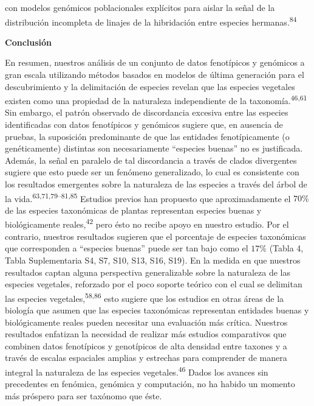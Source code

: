 \documentclass[
  11pt,
]{article}
\begin{document}
con modelos genómicos poblacionales explícitos para aislar la señal de la distribución incompleta de linajes de la hibridación entre especies hermanas.\textsuperscript{84}

\textbf{Conclusión}

En resumen, nuestros análisis de un conjunto de datos fenotípicos y genómicos a gran escala utilizando métodos basados en modelos de última generación para el descubrimiento y la delimitación de especies revelan que las especies vegetales existen como una propiedad de la naturaleza independiente de la taxonomía.\textsuperscript{46,61} Sin embargo, el patrón observado de discordancia excesiva entre las especies identificadas con datos fenotípicos y genómicos sugiere que, en ausencia de pruebas, la suposición predominante de que las entidades fenotípicamente (o genéticamente) distintas son necesariamente ``especies buenas'' no es justificada. Además, la señal en paralelo de tal discordancia a través de clados divergentes sugiere que esto puede ser un fenómeno generalizado, lo cual es consistente con los resultados emergentes sobre la naturaleza de las especies a través del árbol de la vida.\textsuperscript{63,71,79--81,85} Estudios previos han propuesto que aproximadamente el \(70\%\) de las especies taxonómicas de plantas representan especies buenas y biológicamente reales,\textsuperscript{42} pero ésto no recibe apoyo en nuestro estudio. Por el contrario, nuestros resultados sugieren que el porcentaje de especies taxonómicas que corresponden a ``especies buenas'' puede ser tan bajo como el \(17\%\) (Tabla 4, Tabla Suplementaria S4, S7, S10, S13, S16, S19). En la medida en que nuestros resultados captan alguna perspectiva generalizable sobre la naturaleza de las especies vegetales, reforzado por el poco soporte teórico con el cual se delimitan las especies vegetales,\textsuperscript{58,86} esto sugiere que los estudios en otras áreas de la biología que asumen que las especies taxonómicas representan entidades buenas y biológicamente reales pueden necesitar una evaluación más crítica. Nuestros resultados enfatizan la necesidad de realizar más estudios comparativos que combinen datos fenotípicos y genotípicos de alta densidad entre taxones y a través de escalas espaciales amplias y estrechas para comprender de manera integral la naturaleza de las especies vegetales.\textsuperscript{46} Dados los avances sin precedentes en fenómica, genómica y computación, no ha habido un momento más próspero para ser taxónomo que éste.

\begingroup\fontsize{8}{10}\selectfont
\end{document}
